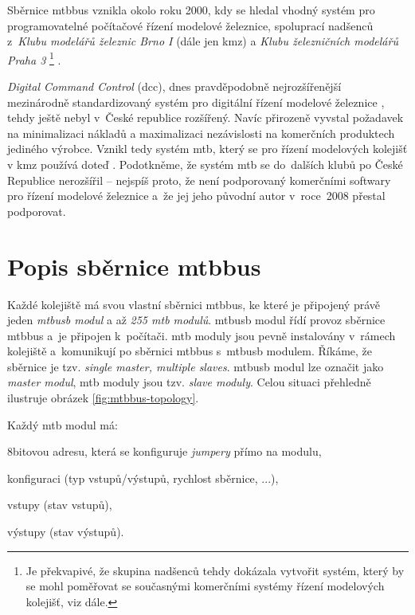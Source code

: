 Sběrnice \gls{mtbbus} vznikla okolo roku 2000, kdy se hledal vhodný systém pro
programovatelné počítačové řízení modelové železnice, spoluprací nadšenců
z~\textit{Klubu modelářů železnic Brno I} (dále jen \gls{kmz}) a \textit{Klubu
železničních modelářů Praha 3} \footnote{Je překvapivé, že
skupina nadšenců tehdy dokázala vytvořit systém, který by se mohl poměřovat se
současnými komerčními systémy řízení modelových kolejišť, viz dále.} \cite{mtb:web}.

\textit{Digital Command Control} (\gls{dcc}), dnes pravděpodobně
nejrozšířenější\footnotemark\\mezinárodně standardizovaný systém pro digitální
řízení modelové železnice \cite{dcc_intro:web}, tehdy ještě nebyl v~České republice
rozšířený. Navíc přirozeně vyvstal požadavek na minimalizaci nákladů
a maximalizaci nezávislosti na komerčních produktech jediného výrobce. Vznikl
tedy systém \gls{mtb}, který se pro řízení modelových kolejišť v \gls{kmz}
používá doteď \cite{kmz_rizeni:web}. Podotkněme, že systém \gls{mtb} se
do~dalších klubů po České Republice nerozšířil – nejspíš proto, že není
podporovaný komerčními softwary pro řízení modelové železnice a~že jej jeho
původní autor v~roce~2008 přestal podporovat.


\section{Popis sběrnice \gls{mtbbus}} \label{sec:mtbbus}

Každé kolejiště má svou vlastní sběrnici \gls{mtbbus}, ke které je připojený
právě jeden \textit{\gls{mtbusb} modul} a až \textit{255 \gls{mtb} modulů}.
\gls{mtbusb} modul řídí provoz sběrnice \gls{mtbbus} a~je připojen k~počítači.
\gls{mtb} moduly jsou pevně instalovány v~rámech kolejiště a~komunikují po
sběrnici \gls{mtbbus} s~\gls{mtbusb} modulem. Říkáme, že sběrnice je tzv.
\textit{single master, multiple slaves}. \gls{mtbusb} modul lze označit jako
\textit{master modul}, \gls{mtb} moduly jsou tzv. \textit{slave moduly}.
Celou situaci přehledně ilustruje obrázek \ref{fig:mtbbus-topology}.

Každý \gls{mtb} modul má:

\begin{compactenum}
\item 8bitovou adresu, která se konfiguruje \textit{jumpery} přímo na modulu,
\item konfiguraci (typ vstupů/výstupů, rychlost sběrnice, ...),
\item vstupy (stav vstupů),
\item výstupy (stav výstupů).
\end{compactenum}


